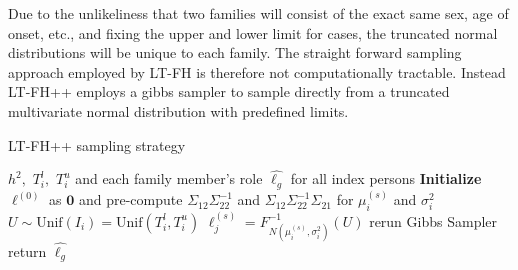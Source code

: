 Due to the unlikeliness that two families will consist of the exact same sex, age of onset, etc., and fixing the upper and lower limit for cases, the truncated normal distributions will be unique to each family. The straight forward sampling approach employed by LT-FH is therefore not computationally tractable. Instead LT-FH++ employs a gibbs sampler to sample directly from a truncated multivariate normal distribution with predefined limits. 


\begin{algorithm}
\caption{LT-FH++ sampling strategy}
\begin{algorithmic}[1]
\INPUT $ h^2,$ $T_{i}^l,$ $T_{i}^u$ and each family member's role 
\OUTPUT $ \hat{\ell_g} $ for all index persons
\GIBBS
\STATE \textbf{Initialize} $\ell^{(0)}$ as $ \mathbf{0} $ and pre-compute $ \Sigma_{12} \Sigma_{22}^{-1} $ and $ \Sigma_{12} \Sigma_{22}^{-1} \Sigma_{21} $ for $ \mu_i^{(s)} $ and $ \sigma^2_i $
	  
	\STATE $ U \sim \text{Unif}(I_i) = \text{Unif}(T_i^l, T_i^u) $ 
	\STATE $ \ell_j^{(s)} = F^{-1}_{N(\mu_i^{(s)}, \sigma_i^2)}(U) $
	\ENDFOR
\ENDFOR
{}
\STATE rerun Gibbs Sampler
\ELSE
\STATE return  $ \hat{\ell_g} $
\ENDIF
\end{algorithmic}
\end{algorithm}




